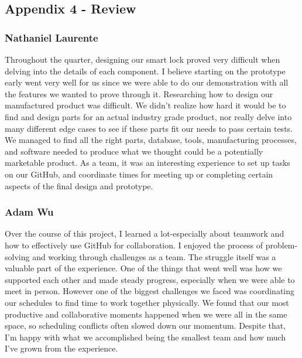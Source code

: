 \newpage
\subsection{Appendix 4 - Review}
    \subsubsection*{Nathaniel Laurente}
    Throughout the quarter, designing our smart lock proved very difficult when delving into the details of each component. I believe starting on the prototype early went very well for us since we were able to do our demonstration with all the features we wanted to prove through it. Researching how to design our manufactured product was difficult. We didn’t realize how hard it would be to find and design parts for an actual industry grade product, nor really delve into many different edge cases to see if these parts fit our needs to pass certain tests. We managed to find all the right parts, database, tools, manufacturing processes, and software needed to produce what we thought could be a potentially marketable product. As a team, it was an interesting experience to set up tasks on our GitHub, and coordinate times for meeting up or completing certain aspects of the final design and prototype.

    \subsubsection*{Adam Wu}
    Over the course of this project, I learned a lot-especially about teamwork and how to effectively use GitHub for collaboration. I enjoyed the process of problem-solving and working through challenges as a team. The struggle itself was a valuable part of the experience. One of the things that went well was how we supported each other and made steady progress, especially when we were able to meet in person. However one of the biggest challenges we faced was coordinating our schedules to find time to work together physically. We found that our most productive and collaborative moments happened when we were all in the same space, so scheduling conflicts often slowed down our momentum. Despite that, I’m happy with what we accomplished being the smallest team and how much I’ve grown from the experience.

